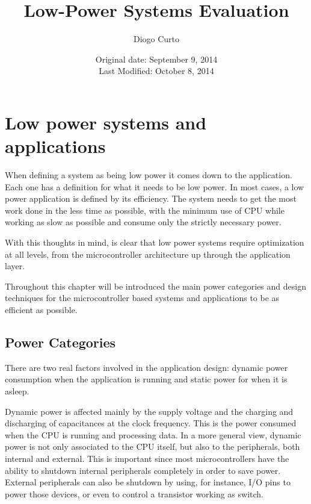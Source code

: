 \documentclass[11pt,a4paper]{report}
\author{Diogo Curto}
\title{Low-Power Systems Evaluation}
\date{Original date: September 9, 2014 \\ Last Modified: October 8, 2014}
\begin{document}
\begin{titlepage}

\maketitle

\end{titlepage}

\tableofcontents

\chapter{Low power systems and applications}

When defining a system as being low power it comes down to the application. Each one has a definition for what it needs to be low power. In most cases, a low power application is defined by its efficiency.  
The system needs to get the most work done in the less time as possible, with the minimum use of CPU while working as slow as possible and consume only the strictly necessary power.\cite{Wong2009}


With this thoughts in mind, is clear that low power systems require optimization at all levels, from the microcontroller architecture up through the application layer.

Throughout this chapter will be introduced the main power categories and design techniques for the microcontroller based systems and applications to be as efficient as possible.

\section{Power Categories}

There are two real factors involved in the application design: dynamic power consumption when the application is running and static power for when it is asleep.\cite{SedraSmith}

Dynamic power is affected mainly by the supply voltage and the charging and discharging of capacitances at the clock frequency. This is the power consumed when the CPU is running and processing data. In a more general view, dynamic power is not only associated to the CPU itself, but also to the peripherals, both internal and external. This is important since most microcontrollers have the ability to shutdown internal peripherals completely in order to save power. External peripherals can also be shutdown by using, for instance, I/O pins to power those devices, or even to control a transistor working as switch.
\end{document}
